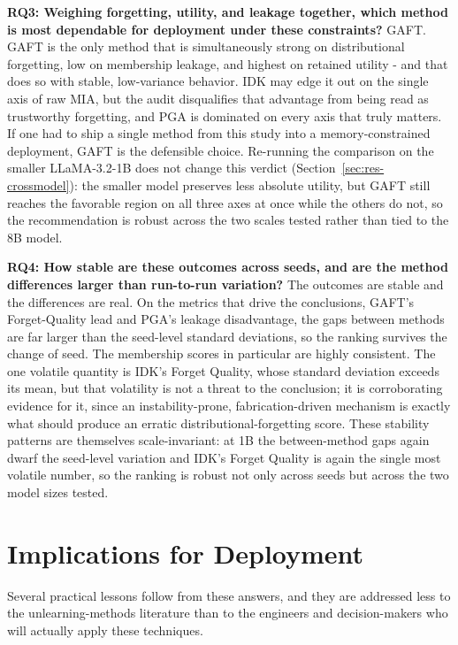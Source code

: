 \documentclass[a4paper,12pt]{report}
\begin{document}
\textbf{RQ3: Weighing forgetting, utility, and leakage together, which method is most dependable for deployment under these constraints?} GAFT. GAFT is the only method that is simultaneously strong on distributional forgetting, low on membership leakage, and highest on retained utility - and that does so with stable, low-variance behavior. IDK may edge it out on the single axis of raw MIA, but the audit disqualifies that advantage from being read as trustworthy forgetting, and PGA is dominated on every axis that truly matters. If one had to ship a single method from this study into a memory-constrained deployment, GAFT is the defensible choice. Re-running the comparison on the smaller LLaMA-3.2-1B does not change this verdict (Section~\ref{sec:res-crossmodel}): the smaller model preserves less absolute utility, but GAFT still reaches the favorable region on all three axes at once while the others do not, so the recommendation is robust across the two scales tested rather than tied to the 8B model.

\textbf{RQ4: How stable are these outcomes across seeds, and are the method differences larger than run-to-run variation?} The outcomes are stable and the differences are real. On the metrics that drive the conclusions, GAFT's Forget-Quality lead and PGA's leakage disadvantage, the gaps between methods are far larger than the seed-level standard deviations, so the ranking survives the change of seed. The membership scores in particular are highly consistent. The one volatile quantity is IDK's Forget Quality, whose standard deviation exceeds its mean, but that volatility is not a threat to the conclusion; it is corroborating evidence for it, since an instability-prone, fabrication-driven mechanism is exactly what should produce an erratic distributional-forgetting score. These stability patterns are themselves scale-invariant: at 1B the between-method gaps again dwarf the seed-level variation and IDK's Forget Quality is again the single most volatile number, so the ranking is robust not only across seeds but across the two model sizes tested.

\section{Implications for Deployment}
\label{sec:disc-implications}
Several practical lessons follow from these answers, and they are addressed less to the unlearning-methods literature than to the engineers and decision-makers who will actually apply these techniques.
\end{document}

